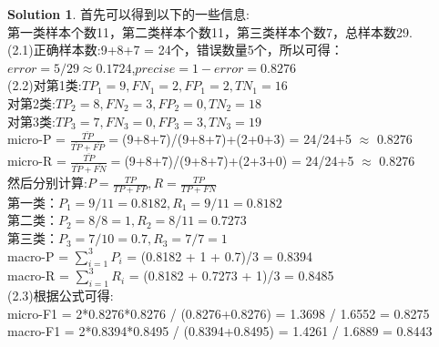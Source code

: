 \documentclass[a4paper,UTF8]{article}
\numberwithin{equation}{section}
\theoremstyle{definition}
\newtheorem*{solution}{Solution}
\begin{document}
\begin{solution}
    首先可以得到以下的一些信息:\\
    第一类样本个数11，第二类样本个数11，第三类样本个数7，总样本数29.\\
    (2.1)正确样本数:9+8+7 = 24个，错误数量5个，所以可得：$error = 5/29 \approx 0.1724$,$precise = 1 - error = 0.8276$\\
    (2.2)对第1类:$TP_1 =9,FN_1 = 2,FP_1 = 2,TN_1 = 16$\\
    对第2类:$TP_2 =8,FN_2 = 3,FP_2 = 0,TN_2 = 18$\\
    对第3类:$TP_3 =7,FN_3 = 0,FP_3 = 3,TN_3 = 19$\\
    micro-P = $\frac{\bar{TP}}{\bar{TP} + \bar{FP}}=$(9+8+7)/(9+8+7)+(2+0+3) = 24/24+5 $\approx$ 0.8276\\
    micro-R = $\frac{\bar{TP}}{\bar{TP} + \bar{FN}}=$(9+8+7)/(9+8+7)+(2+3+0) = 24/24+5 $\approx$ 0.8276\\
    然后分别计算:$P = \frac{TP}{TP + FP},R = \frac{TP}{TP + FN}$\\
    第一类：$P_1 = 9/11 = 0.8182, R_1 = 9 / 11 = 0.8182 $\\
    第二类：$P_2 = 8/8  = 1, R_2 = 8 / 11 = 0.7273 $\\
    第三类：$P_3 = 7/10 = 0.7, R_3 = 7 / 7 = 1 $\\
    macro-P = $\sum_{i=1}^{3}P_i$ = (0.8182 + 1 + 0.7)/3 = 0.8394\\
    macro-R = $\sum_{i=1}^{3}R_i$ = (0.8182 + 0.7273 + 1)/3 = 0.8485\\
    (2.3)根据公式可得:\\
    micro-F1 = 2*0.8276*0.8276 / (0.8276+0.8276) = 1.3698 / 1.6552 = 0.8275\\
    macro-F1 = 2*0.8394*0.8495 / (0.8394+0.8495) = 1.4261 / 1.6889 = 0.8443\\
\end{solution}


\newpage
\end{document}
